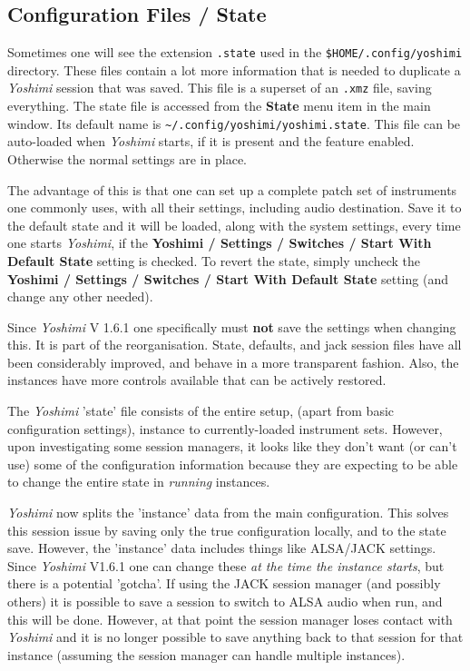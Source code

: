 \subsection{Configuration Files / State}
\label{subsec:configuration_state}

   Sometimes one will see the extension \texttt{.state} used in the
   \texttt{\$HOME/.config/yoshimi} directory.  These files contain a lot
   more information that is needed to duplicate a \textsl{Yoshimi} session
   that was saved.  This file is a superset of an \texttt{.xmz} file,
   saving everything.
   The state file is accessed from the \textbf{State} menu item in the main
   window.
   Its default name is
   \texttt{\textasciitilde/.config/yoshimi/yoshimi.state}.
   This file can be auto-loaded when \textsl{Yoshimi} starts, if it is
   present and the feature enabled. Otherwise the normal settings are in
   place.

   The advantage of this is that one can set up a complete patch set of
   instruments one commonly uses, with all their settings, including audio
   destination.  Save it to the default state and it will be loaded, along
   with the system settings, every time one starts \textsl{Yoshimi}, if the
   \textbf{Yoshimi / Settings / Switches / Start With Default State}
   setting is checked. To revert the state, simply uncheck the
   \textbf{Yoshimi / Settings / Switches / Start With Default State}
   setting (and change any other needed).

   Since \textsl{Yoshimi} V 1.6.1 one specifically must \textbf{not} save
   the settings when changing this. It is part of the reorganisation.
   State, defaults, and jack session files have all been considerably
   improved, and behave in a more transparent fashion. Also, the instances
   have more controls available that can be actively restored.

   The \textsl{Yoshimi} 'state' file consists of the entire setup, (apart
   from basic configuration settings), instance to currently-loaded
   instrument sets. However, upon investigating some session managers, it
   looks like they don't want (or can't use) some of the configuration
   information because they are expecting to be able to change the entire
   state in \textsl{running} instances.

   \textsl{Yoshimi} now splits the 'instance' data
   from the main configuration.  This solves this session issue
   by saving only the true configuration locally, and to the state save.
   However, the 'instance' data includes things like ALSA/JACK settings.
   Since \textsl{Yoshimi} V1.6.1 one can change these
   \textsl{at the time the instance starts}, but there is a potential
   'gotcha'. If using the JACK session manager (and possibly others) it is
   possible to save a session to switch to ALSA audio when run, and this
   will be done. However, at that point the session manager loses contact
   with \textsl{Yoshimi} and it is no longer possible to save anything
   back to that session for that instance (assuming the session manager can
   handle multiple instances).

